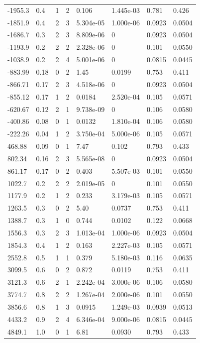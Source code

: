 \documentclass[preview]{standalone}
\begin{document}
{{\begin{tabular}{L{1.2cm}C{1.2cm} C{0.3cm}C{0.5cm} C{1.4cm}C{1.4cm} C{1.4cm}C{1.4cm}}
  -1955.3  &   0.4  & 1     &  2 &  0.106  & 1.445e-03  & 0.781 &  0.426   \\ 
  -1851.9  &   0.4  & 2     &  3 &  5.304e-05  & 1.000e-06  & 0.0923 &  0.0504   \\ 
  -1686.7  &   0.3  & 2     &  3 &  8.809e-06  & 0  & 0.0923 &  0.0504   \\ 
  -1193.9  &   0.2  & 2     &  2 &  2.328e-06  & 0  & 0.101 &  0.0550   \\ 
  -1038.9  &   0.2  & 2     &  4 &  5.001e-06  & 0  & 0.0815 &  0.0445   \\ 
  -883.99  &  0.18  & 0     &  2 &  1.45  & 0.0199  & 0.753 &  0.411   \\ 
  -866.71  &  0.17  & 2     &  3 &  4.518e-06  & 0  & 0.0923 &  0.0504   \\ 
  -855.12  &  0.17  & 1     &  2 &  0.0184  & 2.520e-04  & 0.105 &  0.0571   \\ 
  -620.67  &  0.12  & 2     &  1 &  9.738e-09  & 0  & 0.106 &  0.0580   \\ 
  -400.86  &  0.08  & 0     &  1 &  0.0132  & 1.810e-04  & 0.106 &  0.0580   \\ 
  -222.26  &  0.04  & 1     &  2 &  3.750e-04  & 5.000e-06  & 0.105 &  0.0571   \\ 
  468.88  &  0.09  & 0     &  1 &  7.47  & 0.102  & 0.793 &  0.433   \\ 
  802.34  &  0.16  & 2     &  3 &  5.565e-08  & 0  & 0.0923 &  0.0504   \\ 
  861.17  &  0.17  & 0     &  2 &  0.403  & 5.507e-03  & 0.101 &  0.0550   \\ 
  1022.7  &   0.2  & 2     &  2 &  2.019e-05  & 0  & 0.101 &  0.0550   \\ 
  1177.9  &   0.2  & 1     &  2 &  0.233  & 3.179e-03  & 0.105 &  0.0571   \\ 
  1263.5  &   0.3  & 0     &  2 &  5.40  & 0.0737  & 0.753 &  0.411   \\ 
  1388.7  &   0.3  & 1     &  0 &  0.744  & 0.0102  & 0.122 &  0.0668   \\ 
  1556.3  &   0.3  & 2     &  3 &  1.013e-04  & 1.000e-06  & 0.0923 &  0.0504   \\ 
  1854.3  &   0.4  & 1     &  2 &  0.163  & 2.227e-03  & 0.105 &  0.0571   \\ 
  2552.8  &   0.5  & 1     &  1 &  0.379  & 5.180e-03  & 0.116 &  0.0635   \\ 
  3099.5  &   0.6  & 0     &  2 &  0.872  & 0.0119  & 0.753 &  0.411   \\ 
  3121.3  &   0.6  & 2     &  1 &  2.242e-04  & 3.000e-06  & 0.106 &  0.0580   \\ 
  3774.7  &   0.8  & 2     &  2 &  1.267e-04  & 2.000e-06  & 0.101 &  0.0550   \\ 
  3856.6  &   0.8  & 1     &  3 &  0.0915  & 1.249e-03  & 0.0939 &  0.0513   \\ 
  4433.2  &   0.9  & 2     &  4 &  6.346e-04  & 9.000e-06  & 0.0815 &  0.0445   \\ 
  4849.1  &   1.0  & 0     &  1 &  6.81  & 0.0930  & 0.793 &  0.433   \\ 
\hline 
\end{tabular} 

}}
\end{document}
